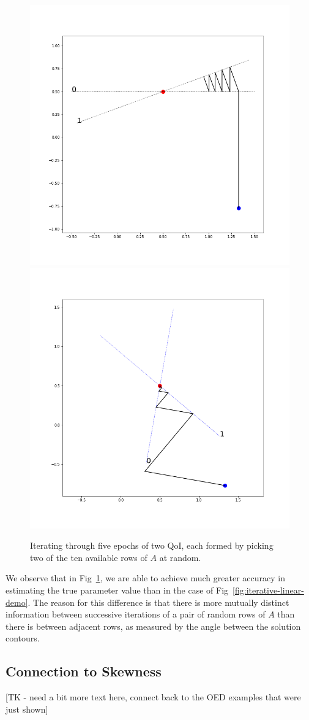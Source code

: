 \begin{figure}
  \centering
  \includegraphics[width=0.475\linewidth]{examples/iterative/10D-fewepochs-pair}
  \includegraphics[width=0.475\linewidth]{examples/iterative/10D-fewepochs-pair-alt}
  \caption{
  Iterating through five epochs of two QoI, each formed by picking two of the ten available rows of $A$ at random.
  }
  \label{fig:iterative-linear-demo-pair}
\end{figure}

We observe that in Fig~\ref{fig:iterative-linear-demo-pair}, we are able to achieve much greater accuracy in estimating the true parameter value than in the case of Fig~\ref{fig:iterative-linear-demo}.
The reason for this difference is that there is more mutually distinct information between successive iterations of a pair of random rows of $A$ than there is between adjacent rows, as measured by the angle between the solution contours.

\subsection{Connection to Skewness}

[TK - need a bit more text here, connect back to the OED examples that were just shown]

